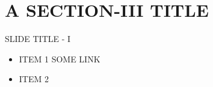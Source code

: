 


\maketitle
\section{A SECTION-III TITLE}
\begin{frame}[t]{SLIDE TITLE - I}
    \begin{itemize}
      \item ITEM 1
      SOME LINK
      \item ITEM 2
    \end{itemize}

\end{frame}


